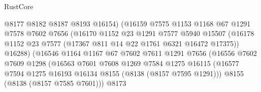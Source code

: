 \begin{lexlean}{RustCore}
\begin{coremodule}
                                    @8177
                                    @8182
                                    @8187
                                    @8193
                                    @16154)
                                  (@16159
                                    @7575
                                    @1153
                                    @1168
                                    @67
                                    @1291
                                    @7578
                                    @7602
                                    @7656
                                    (@16170
                                      @1152
                                      @23
                                      @1291
                                      @7577
                                      @5940
                                      @15507
                                      (@16178
                                        @1152
                                        @23
                                        @7577
                                        (@17367 @811 @14 @22 @1761 @6321 @16472 @17375))
                                      @16288)
                                    (@16546
                                      @1164
                                      @1167
                                      @67
                                      @7602
                                      @7611
                                      @1291
                                      @7656
                                      (@16556
                                        @7602
                                        @7609
                                        @1298
                                        (@16563
                                          @7601
                                          @7608
                                          @1269
                                          @7584
                                          @1275
                                          @16115
                                          (@16577
                                            @7594
                                            @1275
                                            @16193
                                            @16134
                                            @8155
                                            (@8138 (@8157 @7595 @1291)))
                                          @8155
                                          (@8138 (@8157 @7585 @7601)))
                                        @8173

\end{coremodule}
\end{lexlean}
